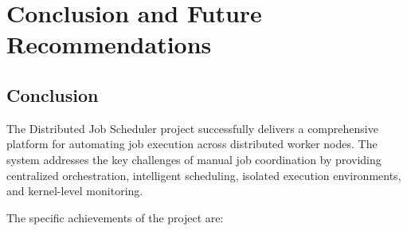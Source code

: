 \chapter{Conclusion and Future Recommendations}

\section{Conclusion}

The Distributed Job Scheduler project successfully delivers a comprehensive platform for automating job execution across distributed worker nodes. The system addresses the key challenges of manual job coordination by providing centralized orchestration, intelligent scheduling, isolated execution environments, and kernel-level monitoring.

The specific achievements of the project are:

